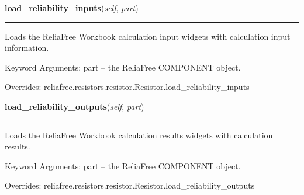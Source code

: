     \vspace{0.5ex}

\hspace{.8\funcindent}\begin{boxedminipage}{\funcwidth}

    \raggedright \textbf{load\_reliability\_inputs}(\textit{self}, \textit{part})

    \vspace{-1.5ex}

    \rule{\textwidth}{0.5\fboxrule}
\setlength{\parskip}{2ex}
    Loads the ReliaFree Workbook calculation input widgets with calculation
    input information.

    Keyword Arguments: part -- the ReliaFree COMPONENT object.

\setlength{\parskip}{1ex}
      Overrides: reliafree.resistors.resistor.Resistor.load\_reliability\_inputs

    \end{boxedminipage}

    \vspace{0.5ex}

\hspace{.8\funcindent}\begin{boxedminipage}{\funcwidth}

    \raggedright \textbf{load\_reliability\_outputs}(\textit{self}, \textit{part})

    \vspace{-1.5ex}

    \rule{\textwidth}{0.5\fboxrule}
\setlength{\parskip}{2ex}
    Loads the ReliaFree Workbook calculation results widgets with 
    calculation results.

    Keyword Arguments: part -- the ReliaFree COMPONENT object.

\setlength{\parskip}{1ex}
      Overrides: reliafree.resistors.resistor.Resistor.load\_reliability\_outputs

    \end{boxedminipage}

    \vspace{0.5ex}


